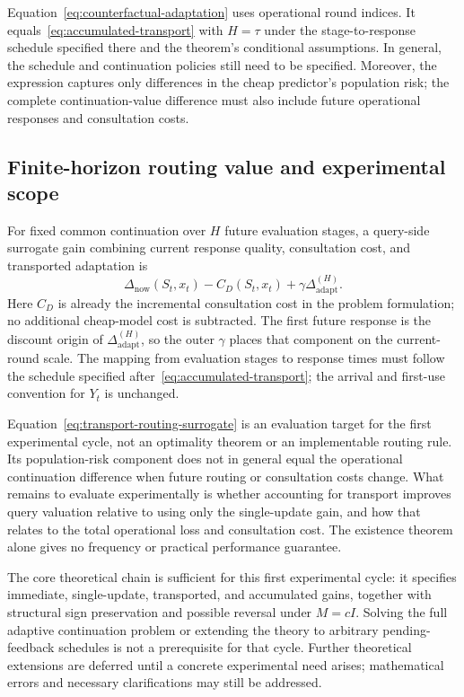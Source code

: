 Equation~\eqref{eq:counterfactual-adaptation} uses operational round
indices. It equals~\eqref{eq:accumulated-transport} with $H=\tau$ under
the stage-to-response schedule specified there and the theorem's
conditional assumptions. In general, the schedule and continuation
policies still need to be specified. Moreover, the expression
captures only differences in the cheap predictor's population risk; the
complete continuation-value difference must also include future operational
responses and consultation costs.

\subsection{Finite-horizon routing value and experimental scope}

For fixed common continuation over $H$ future evaluation stages, a
query-side surrogate gain combining current response quality, consultation
cost, and transported adaptation is
\begin{equation}
    \Delta_{\mathrm{now}}(S_t,x_t)-C_D(S_t,x_t)
       +\gamma\Delta_{\mathrm{adapt}}^{(H)}.
    \label{eq:transport-routing-surrogate}
\end{equation}
Here $C_D$ is already the incremental consultation cost in the problem
formulation; no additional cheap-model cost is subtracted. The first
future response is the discount origin of $\Delta_{\mathrm{adapt}}^{(H)}$,
so the outer $\gamma$ places that component on the current-round scale.
The mapping from evaluation stages to response times must follow the
schedule specified after~\eqref{eq:accumulated-transport}; the arrival and
first-use convention for $Y_t$ is unchanged.

Equation~\eqref{eq:transport-routing-surrogate} is an evaluation target
for the first experimental cycle, not an optimality theorem or an
implementable routing rule. Its population-risk component does not in
general equal the operational continuation difference when future routing
or consultation costs change. What remains to evaluate experimentally is
whether accounting for transport improves query valuation relative to
using only the single-update gain, and how that relates to the total
operational loss and consultation cost. The existence theorem alone gives
no frequency or practical performance guarantee.

The core theoretical chain is sufficient for this first experimental
cycle: it specifies immediate, single-update, transported, and accumulated
gains, together with structural sign preservation and possible reversal
under $M=cI$. Solving the full adaptive continuation problem or extending
the theory to arbitrary pending-feedback schedules is not a prerequisite
for that cycle. Further theoretical extensions are deferred until a
concrete experimental need arises; mathematical errors and necessary
clarifications may still be addressed.
